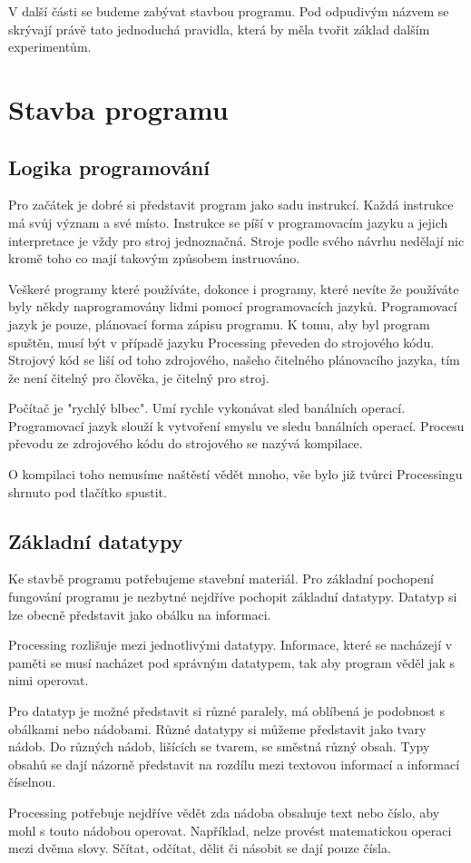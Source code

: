 \documentclass[12pt,twopage]{book}
\newcommand{\oddil}[1]{\section{#1}\label{sec:#1}}
\newcommand{\pododdil}[1]{\subsection{#1}\label{subsec:#1}}
\begin{document}
V další části se budeme zabývat stavbou programu. Pod odpudivým názvem se skrývají právě tato jednoduchá pravidla, která by měla tvořit základ dalším experimentům.   

\newpage
\oddil{Stavba programu}

\pododdil{Logika programování}
Pro začátek je dobré si představit program jako sadu instrukcí. Každá instrukce má svůj význam a své místo. Instrukce se píší v programovacím jazyku a jejich interpretace je vždy pro stroj jednoznačná. Stroje podle svého návrhu nedělají nic kromě toho co mají takovým způsobem instruováno.

Veškeré programy které používáte, dokonce i programy, které nevíte že používáte byly někdy naprogramovány lidmi pomocí programovacích jazyků. Programovací jazyk je pouze, plánovací forma zápisu programu. K tomu, aby byl program spuštěn, musí být v případě jazyku Processing převeden do strojového kódu. Strojový kód se liší od toho zdrojového, našeho čitelného plánovacího jazyka, tím že není čitelný pro člověka, je čitelný pro stroj.

Počítač je "rychlý blbec". Umí rychle vykonávat sled banálních operací. Programovací jazyk slouží k vytvoření smyslu ve sledu banálních operací. Procesu převodu ze zdrojového kódu do strojového se nazývá kompilace.

O kompilaci toho nemusíme naštěstí vědět mnoho, vše bylo již tvůrci Processingu shrnuto pod tlačítko spustit.

\pododdil{Základní datatypy}

Ke stavbě programu potřebujeme stavební materiál. Pro základní pochopení fungování programu je nezbytné nejdříve pochopit základní datatypy. Datatyp si lze obecně představit jako obálku na informaci.

Processing rozlišuje mezi jednotlivými datatypy. Informace, které se nacházejí v paměti se musí nacházet pod správným datatypem, tak aby program věděl jak s nimi operovat.

Pro datatyp je možné představit si různé paralely, má oblíbená je podobnost s obálkami nebo nádobami. Různé datatypy si můžeme představit jako tvary nádob. Do různých nádob, lišících se tvarem, se směstná různý obsah. Typy obsahů se dají názorně představit na rozdílu mezi textovou informací a informací číselnou.

Processing potřebuje nejdříve vědět zda nádoba obsahuje text nebo číslo, aby mohl s touto nádobou operovat. Například, nelze provést matematickou operaci mezi dvěma slovy. Sčítat, odčítat, dělit či násobit se dají pouze čísla.
\end{document}
